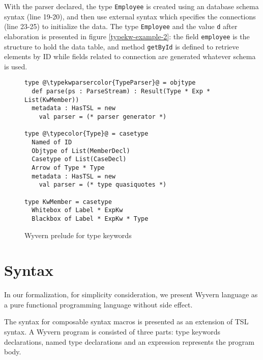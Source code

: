 \documentclass{sig-alternate}
\newcommand{\typekwparsercolor}[1]{\textcolor[HTML]{7C803E}{#1}}
\newcommand{\typecolor}[1]{\textcolor[HTML]{660066}{#1}}
\newcommand{\mycaption}[1]{\vspace{-4px}\caption{#1}\vspace{-2px}}
\begin{document}
With the parser declared, the type \verb|Employee| is created using an database schema syntax (line 19-20), and then use external syntax which specifies the connections (line 23-25) to initialize the data. The type \verb|Employee| and the value \verb|d| after elaboration is presented in figure \ref{typekw-example-2}: the field \verb|employee| is the structure to hold the data table, and method \verb|getById| is defined to retrieve elements by ID while fields related to connection are generated whatever schema is used.
\begin{figure}
\begin{lstlisting}[style=wyvern]
type @\typekwparsercolor{TypeParser}@ = objtype
  def parse(ps : ParseStream) : Result(Type * Exp * List(KwMember))
  metadata : HasTSL = new 
    val parser = (* parser generator *)

type @\typecolor{Type}@ = casetype
  Named of ID
  Objtype of List(MemberDecl)
  Casetype of List(CaseDecl)
  Arrow of Type * Type
  metadata : HasTSL = new
    val parser = (* type quasiquotes *)

type KwMember = casetype
  Whitebox of Label * ExpKw
  Blackbox of Label * ExpKw * Type
\end{lstlisting}
\mycaption{Wyvern prelude for type keywords}
\end{figure}



\section{Syntax}
In our formalization, for simplicity consideration, we present Wyvern language as a pure functional programming language without side effect.

The syntax for composable syntax macros is presented as an extension of TSL syntax. A Wyvern program is consisted of three parts: type keywords declarations, named type declarations and an expression represents the program body. 
\end{document}

